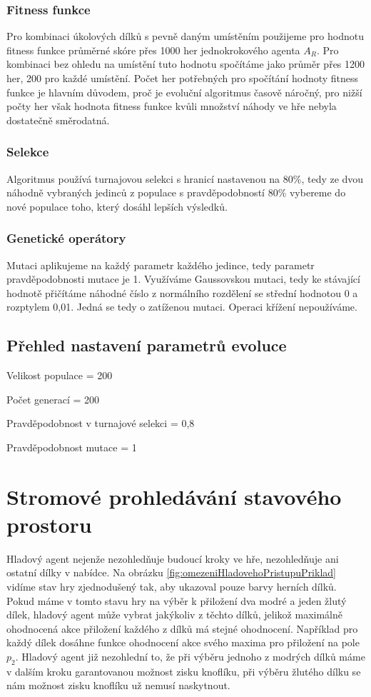 \subsubsection*{Fitness funkce}
Pro kombinaci úkolových dílků s pevně daným umístěním použijeme pro hodnotu fitness funkce průměrné skóre přes 1000 her jednokrokového agenta $A_R$. Pro kombinaci bez ohledu na umístění tuto hodnotu spočítáme jako průměr přes 1200 her, 200 pro každé umístění. Počet her potřebných pro spočítání hodnoty fitness funkce je hlavním důvodem, proč je evoluční algoritmus časově náročný, pro nižší počty her však hodnota fitness funkce kvůli množství náhody ve hře nebyla dostatečně směrodatná.

\subsubsection*{Selekce}
Algoritmus používá turnajovou selekci s hranicí nastavenou na 80\%, tedy ze dvou náhodně vybraných jedinců z populace s pravděpodobností 80\% vybereme do nové populace toho, který dosáhl lepších výsledků.

\subsubsection*{Genetické operátory}
Mutaci aplikujeme na každý parametr každého jedince, tedy parametr pravděpodobnosti mutace je 1. Využíváme Gaussovskou mutaci, tedy ke stávající hodnotě přičítáme náhodné číslo z normálního rozdělení se střední hodnotou 0 a rozptylem 0,01. Jedná se tedy o zatíženou mutaci. Operaci křížení nepoužíváme.

\subsection{Přehled nastavení parametrů evoluce}

Velikost populace = 200

Počet generací = 200

Pravděpodobnost v turnajové selekci = 0,8

Pravděpodobnost mutace = 1


\section{Stromové prohledávání stavového prostoru}
Hladový agent nejenže nezohledňuje budoucí kroky ve hře, nezohledňuje ani ostatní dílky v nabídce. 
Na obrázku \ref{fig:omezeniHladovehoPristupuPriklad} vidíme stav hry zjednodušený tak, aby ukazoval pouze barvy herních dílků. Pokud máme v tomto stavu hry na výběr k přiložení dva modré a jeden žlutý dílek, hladový agent může vybrat jakýkoliv z těchto dílků, jelikož maximálně ohodnocená akce přiložení každého z dílků má stejné ohodnocení. Například pro každý dílek dosáhne funkce ohodnocení akce svého maxima pro přiložení na pole $p_2$. Hladový agent již nezohlední to, že při výběru jednoho z modrých dílků máme v dalším kroku garantovanou možnost zisku knoflíku, při výběru žlutého dílku se nám možnost zisku knoflíku už nemusí naskytnout.

